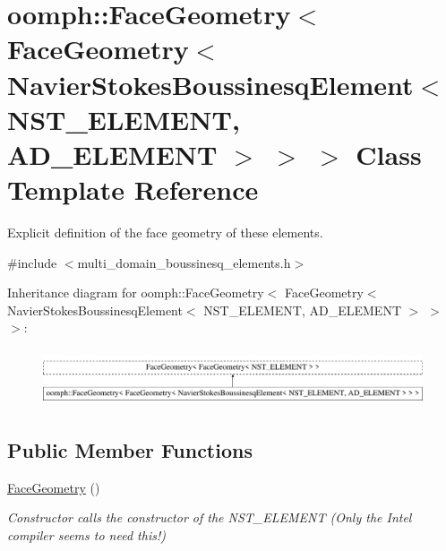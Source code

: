 \hypertarget{classoomph_1_1FaceGeometry_3_01FaceGeometry_3_01NavierStokesBoussinesqElement_3_01NST__ELEMENT_00_01AD__ELEMENT_01_4_01_4_01_4}{}\section{oomph\+:\+:Face\+Geometry$<$ Face\+Geometry$<$ Navier\+Stokes\+Boussinesq\+Element$<$ N\+S\+T\+\_\+\+E\+L\+E\+M\+E\+NT, A\+D\+\_\+\+E\+L\+E\+M\+E\+NT $>$ $>$ $>$ Class Template Reference}
\label{classoomph_1_1FaceGeometry_3_01FaceGeometry_3_01NavierStokesBoussinesqElement_3_01NST__ELEMENT_00_01AD__ELEMENT_01_4_01_4_01_4}


Explicit definition of the face geometry of these elements.  




{\ttfamily \#include $<$multi\+\_\+domain\+\_\+boussinesq\+\_\+elements.\+h$>$}

Inheritance diagram for oomph\+:\+:Face\+Geometry$<$ Face\+Geometry$<$ Navier\+Stokes\+Boussinesq\+Element$<$ N\+S\+T\+\_\+\+E\+L\+E\+M\+E\+NT, A\+D\+\_\+\+E\+L\+E\+M\+E\+NT $>$ $>$ $>$\+:\begin{figure}[H]
\begin{center}
\leavevmode
\includegraphics[height=1.686747cm]{classoomph_1_1FaceGeometry_3_01FaceGeometry_3_01NavierStokesBoussinesqElement_3_01NST__ELEMENT_00_01AD__ELEMENT_01_4_01_4_01_4}
\end{center}
\end{figure}
\subsection*{Public Member Functions}
\begin{DoxyCompactItemize}
\item 
\hyperlink{classoomph_1_1FaceGeometry_3_01FaceGeometry_3_01NavierStokesBoussinesqElement_3_01NST__ELEMENT_00_01AD__ELEMENT_01_4_01_4_01_4_a640fe9a3ce4f84f9d581bf56668dac63}{Face\+Geometry} ()
\begin{DoxyCompactList}\small\item\em Constructor calls the constructor of the N\+S\+T\+\_\+\+E\+L\+E\+M\+E\+NT (Only the Intel compiler seems to need this!) \end{DoxyCompactList}\end{DoxyCompactItemize}


